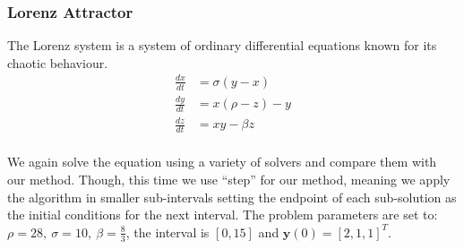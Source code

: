 \documentclass[11pt]{article}
\begin{document}
    \subsubsection{Lorenz Attractor}
    The Lorenz system is a system of ordinary differential equations known for its chaotic behaviour.
    \begin{align*}
        \frac{dx}{dt} &= \sigma( y - x ) \\
        \frac{dy}{dt} &=  x( \rho - z) - y \\
        \frac{dz}{dt} &=  xy - \beta z\\
    \end{align*}

    We again solve the equation using a variety of solvers and compare them with our method.
    Though, this time we use ``step'' for our method, meaning we apply the algorithm in smaller sub-intervals setting
    the endpoint of each sub-solution as the initial conditions for the next interval.
    The problem parameters are set to: $\rho = 28, \ \sigma=10,\ \beta = \frac{8}{3}$, the interval is $[0, 15]$ and
    $\pmb{y}(0) = [2, 1 ,1]^T $.
\end{document}
